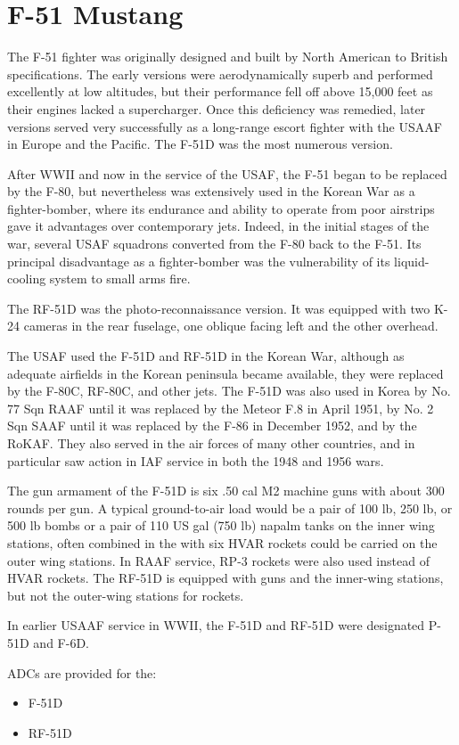 \section*{F-51 Mustang}

The F-51 fighter was originally designed and built by North American to British specifications. The early versions were aerodynamically superb and performed excellently at low altitudes, but their performance fell off above 15,000 feet as their engines lacked a supercharger. Once this deficiency was remedied, later versions served very successfully as a long-range escort fighter with the USAAF in Europe and the Pacific. The F-51D was the most numerous version.

After WWII and now in the service of the USAF, the F-51 began to be replaced by the F-80, but nevertheless was extensively used in the Korean War as a fighter-bomber, where its endurance and ability to operate from poor airstrips gave it advantages over contemporary jets. Indeed, in the initial stages of the war, several USAF squadrons converted from the F-80 back to the F-51. Its principal disadvantage as a fighter-bomber was the vulnerability of its liquid-cooling system to small arms fire.

The RF-51D was the photo-reconnaissance version. It was equipped with two K-24 cameras in the rear fuselage, one oblique facing left and the other overhead. 

The USAF used the F-51D and RF-51D in the Korean War, although as adequate airfields in the Korean peninsula became available, they were replaced by the F-80C, RF-80C, and other jets. The F-51D was also used in Korea by No. 77 Sqn RAAF until it was replaced by the Meteor F.8 in April 1951, by No. 2 Sqn SAAF until it was replaced by the F-86 in December 1952, and by the RoKAF. They also served in the air forces of many other countries, and in particular saw action in IAF service in both the 1948 and 1956 wars. 

The gun armament of the F-51D is six .50 cal M2 machine guns with about 300 rounds per gun. A typical ground-to-air load would be a pair of 100 lb, 250 lb, or 500 lb bombs or a pair of 110 US gal (750 lb) napalm tanks on the inner wing stations, often combined in the with six HVAR rockets could be carried on the outer wing stations. In RAAF service, RP-3 rockets were also used instead of HVAR rockets. The RF-51D is equipped with guns and the inner-wing stations, but not the outer-wing stations for rockets.

In earlier USAAF service in WWII, the F-51D and RF-51D were designated P-51D and F-6D.

ADCs are provided for the:
\begin{itemize}
\item F-51D
\item RF-51D
\end{itemize}
